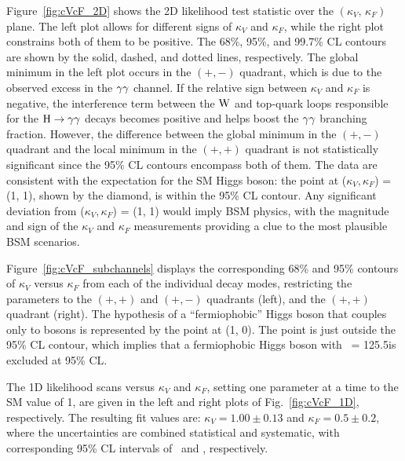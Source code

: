 \documentclass[12pt,twoside,a4paper,cmspaper,final,collab]{cms-tdr}
\begin{document}
Figure~\ref{fig:cVcF_2D} shows the 2D likelihood test statistic
over the $(\kappa_V,\,\kappa_F)$ plane.
The left plot allows for different signs of $\kappa_V$ and $\kappa_F$, while the
right plot constrains both of them to be positive.
The 68\%,  95\%, and 99.7\% CL contours
are shown by the solid, dashed, and dotted lines, respectively.
The global minimum in the left plot
occurs in the $(+,-)$ quadrant, which is due to the observed excess in the $\gamma\gamma$ channel.
If the relative sign between
$\kappa_V$ and $\kappa_F$ is negative, the interference term between
the $\mathrm{W}$ and top-quark loops responsible for the $\mathrm{H} \to \gamma\gamma$ decays becomes positive
and helps boost the $\gamma\gamma$ branching fraction.
However, the difference between the global minimum in the $(+,-)$ quadrant and
the local minimum in the $(+,+)$ quadrant is not statistically significant
since the 95\% CL contours encompass both of them.
The data are consistent with the expectation for the
SM Higgs boson: the point at ($\kappa_V,\kappa_F$) = (1, 1), shown by the diamond, is within the 95\% CL contour.
Any significant deviation from ($\kappa_V,\kappa_F$) = (1, 1) would imply BSM physics, with
the magnitude and sign of the $\kappa_V$ and $\kappa_F$ measurements
providing a clue to the most plausible BSM scenarios.

Figure~\ref{fig:cVcF_subchannels} displays the corresponding 68\% and 95\% contours of $\kappa_V$ versus $\kappa_F$
from each of the individual decay modes,
restricting the parameters to the $(+,+)$ and $(+,-)$ quadrants (left), and the $(+,+)$ quadrant (right).
The hypothesis of a ``fermiophobic'' Higgs boson that couples only to bosons
is represented by the point at (1, 0). The point is just outside the 95\% CL contour,
which implies that  a fermiophobic Higgs boson with \mH\ = 125.5\GeV is excluded at 95\% CL.

The 1D likelihood scans versus $\kappa_V$ and $\kappa_F$,
setting one parameter at a time to the SM value of 1,
are given in the left and right plots of Fig.~\ref{fig:cVcF_1D}, respectively.
The resulting fit values are:
$\kappa_V =1.00 \pm 0.13$ and
$\kappa_F= 0.5 \pm 0.2$,
where the uncertainties are combined statistical and
systematic, with corresponding
95\% CL intervals of \CVNF\ and \CFNF, respectively.
\end{document}
